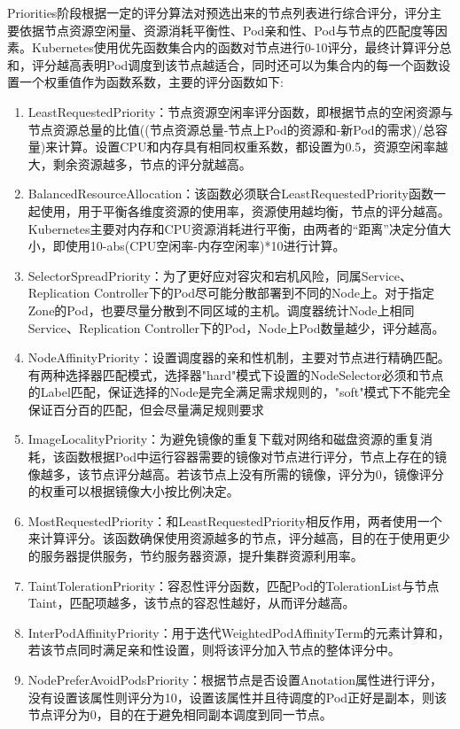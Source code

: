Priorities阶段根据一定的评分算法对预选出来的节点列表进行综合评分，评分主要依据节点资源空闲量、资源消耗平衡性、Pod亲和性、Pod与节点的匹配度等因素。Kubernetes使用优先函数集合内的函数对节点进行0-10评分，最终计算评分总和，评分越高表明Pod调度到该节点越适合，同时还可以为集合内的每一个函数设置一个权重值作为函数系数，主要的评分函数如下:
\begin{enumerate}[(1)]
	\item LeastRequestedPriority：节点资源空闲率评分函数，即根据节点的空闲资源与节点资源总量的比值((节点资源总量-节点上Pod的资源和-新Pod的需求)/总容量)来计算。设置CPU和内存具有相同权重系数，都设置为0.5，资源空闲率越大，剩余资源越多，节点的评分就越高。
	\item BalancedResourceAllocation：该函数必须联合LeastRequestedPriority函数一起使用，用于平衡各维度资源的使用率，资源使用越均衡，节点的评分越高。Kubernetes主要对内存和CPU资源消耗进行平衡，由两者的“距离”决定分值大小，即使用10-abs(CPU空闲率-内存空闲率)*10进行计算。
	\item SelectorSpreadPriority：为了更好应对容灾和宕机风险，同属Service、Replication Controller下的Pod尽可能分散部署到不同的Node上。对于指定Zone的Pod，也要尽量分散到不同区域的主机。调度器统计Node上相同Service、Replication Controller下的Pod，Node上Pod数量越少，评分越高。
	\item NodeAffinityPriority：设置调度器的亲和性机制，主要对节点进行精确匹配。有两种选择器匹配模式，选择器"hard"模式下设置的NodeSelector必须和节点的Label匹配，保证选择的Node是完全满足需求规则的，"soft"模式下不能完全保证百分百的匹配，但会尽量满足规则要求
	\item ImageLocalityPriority：为避免镜像的重复下载对网络和磁盘资源的重复消耗，该函数根据Pod中运行容器需要的镜像对节点进行评分，节点上存在的镜像越多，该节点评分越高。若该节点上没有所需的镜像，评分为0，镜像评分的权重可以根据镜像大小按比例决定。
	\item MostRequestedPriority：和LeastRequestedPriority相反作用，两者使用一个来计算评分。该函数确保使用资源越多的节点，评分越高，目的在于使用更少的服务器提供服务，节约服务器资源，提升集群资源利用率。
	\item TaintTolerationPriority：容忍性评分函数，匹配Pod的TolerationList与节点Taint，匹配项越多，该节点的容忍性越好，从而评分越高。
	\item InterPodAffinityPriority：用于迭代WeightedPodAffinityTerm的元素计算和，若该节点同时满足亲和性设置，则将该评分加入节点的整体评分中。
	\item NodePreferAvoidPodsPriority：根据节点是否设置Anotation属性进行评分，没有设置该属性则评分为10，设置该属性并且待调度的Pod正好是副本，则该节点评分为0，目的在于避免相同副本调度到同一节点。
\end{enumerate}

